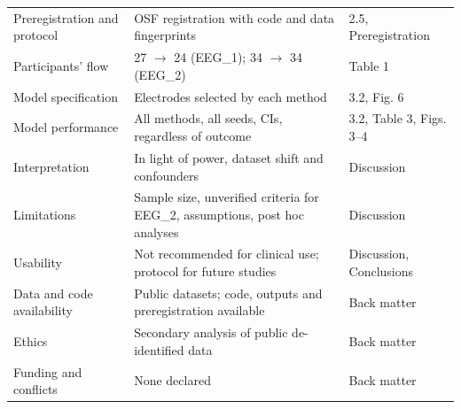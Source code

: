 \documentclass[10pt,letterpaper]{article}
\begin{document}
\begin{longtable}{@{}p{4.2cm}p{8.2cm}p{3.6cm}@{}}
Preregistration and protocol & OSF registration with code and data fingerprints & 2.5, Preregistration \\
Participants' flow & 27 $\rightarrow$ 24 (EEG\_1); 34 $\rightarrow$ 34 (EEG\_2) & Table 1 \\
Model specification & Electrodes selected by each method & 3.2, Fig. 6 \\
Model performance & All methods, all seeds, CIs, regardless of outcome & 3.2, Table 3, Figs. 3--4 \\
Interpretation & In light of power, dataset shift and confounders & Discussion \\
Limitations & Sample size, unverified criteria for EEG\_2, assumptions, post hoc analyses & Discussion \\
Usability & Not recommended for clinical use; protocol for future studies & Discussion, Conclusions \\
Data and code availability & Public datasets; code, outputs and preregistration available & Back matter \\
Ethics & Secondary analysis of public de-identified data & Back matter \\
Funding and conflicts & None declared & Back matter \\
\bottomrule
\end{longtable}
\end{document}
